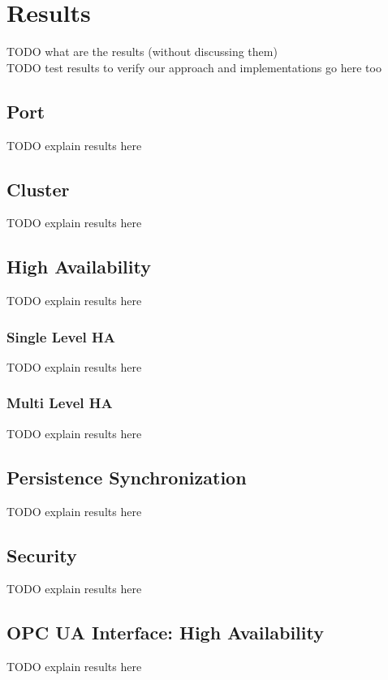 \chapter{Results}
TODO what are the results (without discussing them)\\
TODO test results to verify our approach and implementations go here too\\

\section{Port}\label{sec:res:port}
TODO explain results here\\


\section{Cluster}\label{sec:res:cluster}
TODO explain results here\\


\section{High Availability}\label{sec:res:ha}
TODO explain results here\\

\subsection*{Single Level HA}\label{sec:res:sl-ha}
TODO explain results here\\

\subsection*{Multi Level HA}\label{sec:res:ml-ha}
TODO explain results here\\

\section{Persistence Synchronization}\label{sec:res:psync}
TODO explain results here\\

\section{Security}\label{sec:res:security}
TODO explain results here\\

\section{OPC UA Interface: High Availability}\label{sec:res:opc-ua}
TODO explain results here\\

